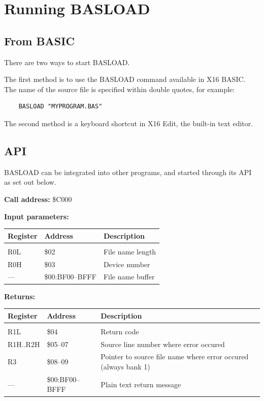 \documentclass{article}
\begin{document}
\section{Running BASLOAD}

    \subsection{From BASIC}

        There are two ways to start BASLOAD.

        The first method is to use the BASLOAD command available in X16 BASIC. The
        name of the source file is specified within double quotes, for example:

        \begin{verbatim}
    BASLOAD "MYPROGRAM.BAS"
        \end{verbatim}

        The second method is a keyboard shortcut in X16 Edit, the built-in text editor.

    \subsection{API}

        BASLOAD can be integrated into other programs, and started through its
        API as set out below.

        \vspace{1em}
        \textbf{Call address:} \$C000

        \textbf{Input parameters:} 

        \begin{longtable}[l]{l l p{6cm}}
            \textbf{Register} & \textbf{Address} & \textbf{Description} \\
            \hline \\
            R0L & \$02            & File name length \\
            R0H & \$03            & Device number \\
            ---  & \$00:BF00--BFFF & File name buffer \\
        \end{longtable}
        \vspace{-1.5em}
        \textbf{Returns:} 

        \begin{longtable}[l]{l l p{6cm}}
            \textbf{Register} & \textbf{Address} & \textbf{Description} \\
            \hline \\
            R1L      & \$04       & Return code \\
            R1H..R2H & \$05--07   & Source line number where error occured \\
            R3       & \$08--09   & Pointer to source file name where error occured (always bank 1) \\
            ---      & \$00:BF00--BFFF & Plain text return message \\
        \end{longtable}
\end{document}
